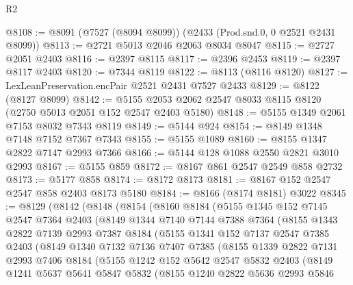 \begin{lexlean}{R2}
\begin{coremodule}
@8108 := @8091 (@7527 (@8094 @8099)) (@2433 (Prod.snd.{0, 0} @2521 @2431 @8099))
@8113 := @2721 @5013 @2046 @2063 @8034 @8047
@8115 := @2727 @2051 @2403
@8116 := @2397 @8115
@8117 := @2396 @2453
@8119 := @2397 @8117 @2403
@8120 := @7344 @8119
@8122 := @8113 (@8116 @8120)
@8127 := LexLeanPreservation.encPair @2521 @2431 @7527 @2433
@8129 := @8122 (@8127 @8099)
@8142 := @5155 @2053 @2062 @2547 @8033 @8115 @8120 (@2750 @5013 @2051 @152 @2547 @2403 @5180)
@8148 := @5155 @1349 @2061 @7153 @8032 @7343 @8119
@8149 := @5144 @924
@8154 := @8149 @1348 @7148 @7152 @7367 @7343
@8155 := @5155 @1089
@8160 := @8155 @1347 @2822 @7147 @2993 @7366
@8166 := @5144 @128 @1088 @2550 @2821 @3010 @2993
@8167 := @5155 @859
@8172 := @8167 @861 @2547 @2549 @858 @2732
@8173 := @5177 @858
@8174 := @8172 @8173
@8181 := @8167 @152 @2547 @2547 @858 @2403 @8173 @5180
@8184 := @8166 (@8174 @8181) @3022
@8345 := @8129
    (@8142
      (@8148
        (@8154
          (@8160
            @8184
            (@5155
              @1345
              @152
              @7145
              @2547
              @7364
              @2403
              (@8149
                @1344
                @7140
                @7144
                @7388
                @7364
                (@8155
                  @1343
                  @2822
                  @7139
                  @2993
                  @7387
                  @8184
                  (@5155
                    @1341
                    @152
                    @7137
                    @2547
                    @7385
                    @2403
                    (@8149
                      @1340
                      @7132
                      @7136
                      @7407
                      @7385
                      (@8155
                        @1339
                        @2822
                        @7131
                        @2993
                        @7406
                        @8184
                        (@5155
                          @1242
                          @152
                          @5642
                          @2547
                          @5832
                          @2403
                          (@8149
                            @1241
                            @5637
                            @5641
                            @5847
                            @5832
                            (@8155
                              @1240
                              @2822
                              @5636
                              @2993
                              @5846

\end{coremodule}
\end{lexlean}
